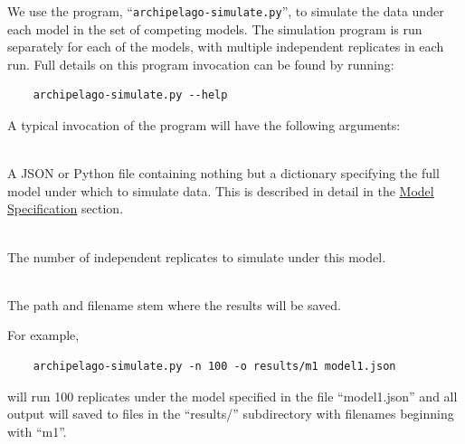 \documentclass[11pt,openany]{memoir} %
\let\Item\item
\newcommand\SpecialItem{\renewcommand\item[1][]{\Item[\textbullet~\bfseries##1]}}
\begin{document}
We use the program, ``\texttt{archipelago-simulate.py}'', to simulate the data under each model in the set of competing models.
The simulation program is run separately for each of the models, with multiple independent replicates in each run.
Full details on this program invocation can be found by running:
\begin{lstlisting}
    archipelago-simulate.py --help
\end{lstlisting}
A typical invocation of the program will have the following arguments:
\begin{description}
    \SpecialItem
    \item[``MODEL-FILE''] \hfill \\
        A JSON or Python file containing nothing but a dictionary specifying the full model under which to simulate data. This is described in detail in the \hyperref[sec:workflow-model-specification]{Model Specification} section.
    \item[``\texttt{-n}'' or ``\texttt{--nreps}''] \hfill \\
        The number of independent replicates to simulate under this model.
    \item[``\texttt{-o}'' or ``\texttt{--output-prefix}''] \hfill \\
        The path and filename stem where the results will be saved.
\end{description}
For example,
\begin{lstlisting}
    archipelago-simulate.py -n 100 -o results/m1 model1.json
\end{lstlisting}
will run 100 replicates under the model specified in the file ``model1.json'' and all output will saved to files in the ``results/'' subdirectory with filenames beginning with ``m1''.
\end{document}
